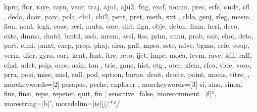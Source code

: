 {{      kpro, ffor, raye, rayn, vsur, traj, aju1, aju2, frig,
      excf, nomm, prec, erfc, onde, cfl , dedo, dcov, parc,
      pola, chi1, chi2, pent, pret, meth, xxt , cblo, genj,
      zleg, mesm, fion, neut, logk, coac, resi, mutu, sore,
      diri, lign, obje, debm, finm, heri, deco, exte, dmmu,
      dmtd, bmtd, ssch, mrem, assi, fiss, prim, annu, prob,
      sais, choi, deto, part, clmi, pmat, excp, prop, phaj,
      alea, gnfl, mpro, sste, adve, bgmo, ecfe, coup, verm,
      dfer, gyro, cori, kent, fant, itrc, reto, ijet, impe,
      moca, levm, ravc, idli, raff, cfnd, adet, psip, acos,
      asin, tan , trie, gane, hist, etg , oter, xfem, rfco,
      vide, voro, prra, posi, mise, misl, coll, pod,  
      option, borne, droit, droite, point, moins, titre,
  },
  morekeywords=[2]{  %
    pasapas, peche, explorer
  },
  morekeywords=[3]{  %
    si, sino, sinon, fins, finsi, repe, repeter, quit, fin
  },
  sensitive=false, %
  morecomment=[f]*, %
  morestring=[b]', %
  moredelim=[is][\sffamily\slshape\color{blue}]{/*}{*/}
}
